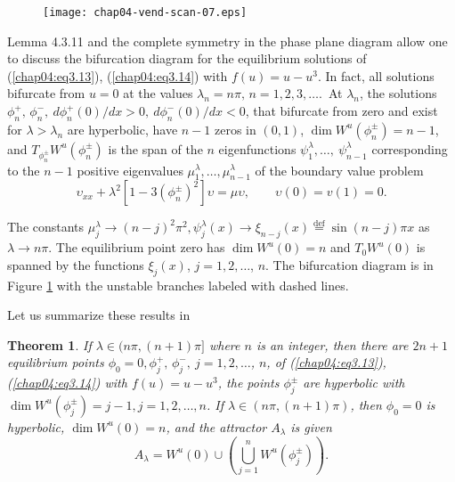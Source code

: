 \documentclass{surv-l}
\theoremstyle{plain}
\newtheorem{theorem}{Theorem}[section]
\theoremstyle{definition}
\numberwithin{equation}{section}
\numberwithin{figure}{chapter}
\begin{document}
\begin{figure}
\texttt{[image: chap04-vend-scan-07.eps]}
\caption{}\label{fig3.5}
\end{figure}

Lemma 4.3.11 and the complete symmetry in the phase plane diagram allow one to discuss the bifurcation diagram for the equilibrium solutions of (\ref{chap04:eq3.13}), (\ref{chap04:eq3.14}) with $f(u)=u-u^{3}$. In fact, all solutions bifurcate from $u=0$ at the values $\lambda_{n}=n\pi,\,n=1,2,3,\ldots.$\, At $\lambda_{n}$, the solutions $\phi_{n}^{+},\,\phi_{n}^{-},\ d\phi_{n}^{+}(0)/dx>0,\ d\phi_{n}^{-}(0)/dx<0$, that bifurcate from zero and exist for $\lambda>\lambda_{n}$ are hyperbolic, have $n-1$ zeros in $(0,1)$, $\dim W^{u}(\phi_{n}^{\pm})=n-1$, and $T_{\phi_{n}^{\pm}}W^{u}(\phi_{n}^{\pm})$ is the span of the $n$ eigenfunctions $\psi_{1}^{\lambda},\ldots,\ \psi_{n-1}^{\lambda}$ corresponding to the $n-1$ positive eigenvalues $\mu_{1}^{\lambda},\ldots,\mu_{n-1}^{\lambda}$ of the boundary value problem
\begin{equation*}
\upsilon_{xx}+\lambda^{2}[1-3(\phi_{n}^{\pm})^{2}]\upsilon=\mu \upsilon, \qquad \upsilon(0)=v(1)=0.
\end{equation*}

The constants $\mu_{j}^{\lambda}\rightarrow(n-j)^{2}\pi^{2},\psi_{j}^{\lambda}(x)\rightarrow\xi_{n-j}(x)\overset{\mathrm{def}}{=}\sin(n-j)\pi x$ as $\lambda \rightarrow n\pi$. The equilibrium point zero has $\dim W^{u}(0)=n$ and $T_{0}W^{u}(0)$ is spanned by the functions $\xi_{j}(x)$, $j=1,2,\ldots$, $n$. The bifurcation diagram is in Figure \ref{fig3.5} with the unstable branches labeled with dashed lines.

Let us summarize these results in

\begin{theorem}\label{thm4.3.12} If $\lambda \in(n\pi, (n+1)\pi]$ where $n$ is an integer, then there
are $2n+1$ equilibrium points $\phi_{0}=0,\phi_{j}^{+},\,\phi_{j}^{-},\ j=1,2,\ldots$, $n$, of \emph{(\ref{chap04:eq3.13}), (\ref{chap04:eq3.14})} with $f(u)=u-u^{3}$, the points $\phi_{j}^{\pm}$ are hyperbolic with $\dim W^{u}(\phi_{j}^{\pm})=j-1,j=1,2,\ldots,n$. If $\lambda \in(n\pi, (n+1)\pi)$, then $\phi_{0}=0$ is hyperbolic, $\dim W^{u}(0)=n$, and the attractor $A_{\lambda}$ is given 
\begin{equation*}
A_{\lambda}=W^{u}(0)\cup\left(\bigcup_{j=1}^{n}W^{u}(\phi_{j}^{\pm})\right).
\end{equation*}
\end{theorem}
\end{document}
